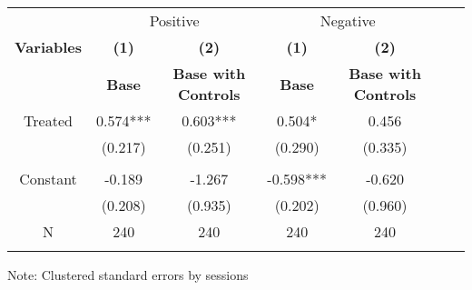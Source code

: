  \begin{table}[htbp]
    \begin{tabular}{c c c c c c c }
    \toprule
    &\multicolumn{2}{c}{Positive}         &\multicolumn{2}{c}{Negative}      \\

    \textbf{Variables} & \textbf{(1)} & \textbf{(2)}  & \textbf{(1)} & \textbf{(2)}              \\ 

    \textbf & \textbf{ Base } & \textbf{Base with Controls}  & \textbf{ Base } & \textbf{Base with Controls}  \\ 

    \midrule
     Treated           &  0.574***   & 0.603***    & 0.504*     & 0.456  \\
                       & (0.217)     & (0.251)     & (0.290)    & (0.335)   \\
                       &             &             &            &                  \\

    Constant           &  -0.189     &  -1.267     & -0.598***  & -0.620             \\
                       &  (0.208)    &  (0.935)    & (0.202)    & (0.960)            \\
   

    \midrule
     N                  &   240          &      240  &     240  &     240        \\          
    \bottomrule
    \addlinespace[1ex]
    \multicolumn{3}{l}{\textsuperscript{***}$p<0.01$, 
      \textsuperscript{**}$p<0.05$, 
      \textsuperscript{*}$p<0.1$}
    \end{tabular}
    \newline
    Note: Clustered standard errors by sessions
\end{table}
